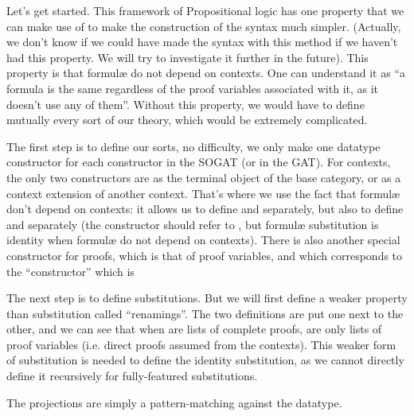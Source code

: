 \documentclass[10pt,a4paper]{article}
\begin{document}
			Let's get started. This framework of Propositional logic has one property that we can make use of to make the construction of the syntax much simpler. (Actually, we don't know if we could have made the syntax with this method if we haven't had this property. We will try to investigate it further in the future). This property is that formulæ do not depend on contexts. One can understand it as \enquote{a formula is the same regardless of the proof variables associated with it, as it doesn't use any of them}. Without this property, we would have to define mutually every sort of our theory, which would be extremely complicated.
			
			The first step is to define our sorts, no difficulty, we only make one datatype constructor for each constructor in the SOGAT (or in the GAT). For contexts, the only two constructors are as the terminal object of the base category, or as a context extension of another context. That's where we use the fact that formulæ don't depend on contexts: it allows us to define  and  separately, but also to define  and  separately (the  constructor should refer to , but formulæ substitution is identity when formulæ do not depend on contexts). There is also another special constructor for proofs, which is that of proof variables, and which corresponds to the \enquote{constructor} which is 
			
			\begin{tcolorbox}
				\agdasep
			\end{tcolorbox}
		
			The next step is to define substitutions. But we will first define a weaker property than substitution called \enquote{renamings}. The two definitions are put one next to the other, and we can see that when  are lists of complete proofs,  are only lists of proof variables (i.e. direct proofs assumed from the contexts). This weaker form of substitution is needed to define the identity substitution, as we cannot directly define it recursively for fully-featured substitutions.
			
			The projections are simply a pattern-matching against the datatype.
			
			\begin{tcolorbox}
				\agda{agda/ZOL-I-4.tex}
				\agdasep
				\agda{agda/ZOL-I-6.tex}
				\vspace{0ex}
				\agda{agda/ZOL-I-7.tex}
			\end{tcolorbox}
		
\end{document}
